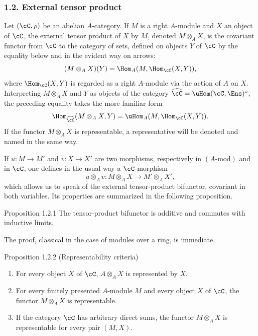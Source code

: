 \subsubsection*{1.2. External tensor product}
Let $(\cC,\rho)$ be an abelian $A$-category. If $M$ is a right $A$-module and $X$ an object of $\cC$, the external tensor product of $X$ by $M$, denoted $M\otimes_A X$, is the covariant functor from $\cC$ to the category of sets, defined on objects $Y$ of $\cC$ by the equality below and in the evident way on arrows:
\[
(M\otimes_A X)(Y)=\Hom_A(M,\Hom_{\cC}(X,Y)),
\]
where $\Hom_{\cC}(X,Y)$ is regarded as a right $A$-module via the action of $A$ on $X$. Interpreting $M\otimes_AX$ and $Y$ as objects of the category $\widehat{\cC}=\uHom(\cC,\Ens)^{\circ}$, the preceding equality takes the more familiar form
\[
\Hom_{\widehat{\cC}}(M\otimes_A X,Y)=\uHom_A(M,\Hom_{\cC}(X,Y)).
\]
If the functor $M\otimes_A X$ is representable, a representative will be denoted and named in the same way.

If $u:M\to M'$ and $v:X\to X'$ are two morphisms, respectively in $(A\text{-mod})$ and in $\cC$, one defines in the usual way a $\cC$-morphism
\[
u\otimes_A v:M\otimes_A X\longrightarrow M'\otimes_A X',
\]
which allows us to speak of the external tensor-product bifunctor, covariant in both variables. Its properties are summarized in the following proposition.

\begin{statement}{Proposition 1.2.1}
The tensor-product bifunctor is additive and commutes with inductive limits.
\end{statement}
The proof, classical in the case of modules over a ring, is immediate.

\begin{statement}{Proposition 1.2.2 (Representability criteria)}
\begin{enumerate}[label=(\alph*)]
\item For every object $X$ of $\cC$, $A\otimes_AX$ is represented by $X$.
\item For every finitely presented $A$-module $M$ and every object $X$ of $\cC$, the functor $M\otimes_AX$ is representable.
\item If the category $\cC$ has arbitrary direct sums, the functor $M\otimes_A X$ is representable for every pair $(M,X)$.
\end{enumerate}
\end{statement}


